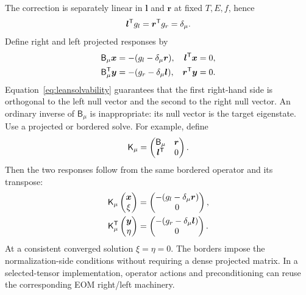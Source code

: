 The correction is separately linear in $\bm l$ and $\bm r$ at fixed
$T,E,f$, hence
\begin{equation}
 \bm l^{\mathsf T}g_l=\bm r^{\mathsf T}g_r=\delta_\mu.
 \label{eq:leansolvability}
\end{equation}
Define right and left projected responses by
\begin{align}
 \mathsf B_\mu\bm x&=-(g_l-\delta_\mu\bm r),
       &\bm l^{\mathsf T}\bm x&=0,\\
 \mathsf B_\mu^{\mathsf T}\bm y&=-(g_r-\delta_\mu\bm l),
       &\bm r^{\mathsf T}\bm y&=0.
 \label{eq:leanresponses}
\end{align}
Equation~\eqref{eq:leansolvability} guarantees that the first right-hand
side is orthogonal to the left null vector and the second to the right
null vector. An ordinary inverse of $\mathsf B_\mu$ is inappropriate:
its null vector is the target eigenstate. Use a projected or bordered solve.
For example, define
\begin{equation}
 \mathsf K_\mu=\begin{pmatrix}\mathsf B_\mu&\bm r\\
                                  \bm l^{\mathsf T}&0\end{pmatrix}.
\end{equation}
Then the two responses follow from the same bordered operator and its
transpose:
\begin{align}
 \mathsf K_\mu\begin{pmatrix}\bm x\\\xi\end{pmatrix}
 &=\begin{pmatrix}-(g_l-\delta_\mu\bm r)\\0\end{pmatrix},\\
 \mathsf K_\mu^{\mathsf T}\begin{pmatrix}\bm y\\\eta\end{pmatrix}
 &=\begin{pmatrix}-(g_r-\delta_\mu\bm l)\\0\end{pmatrix}.
 \label{eq:leanborders}
\end{align}
At a consistent converged solution $\xi=\eta=0$. The borders impose the
normalization-side conditions without requiring a dense projected matrix.
In a selected-tensor implementation, operator actions and preconditioning
can reuse the corresponding EOM right/left machinery.


